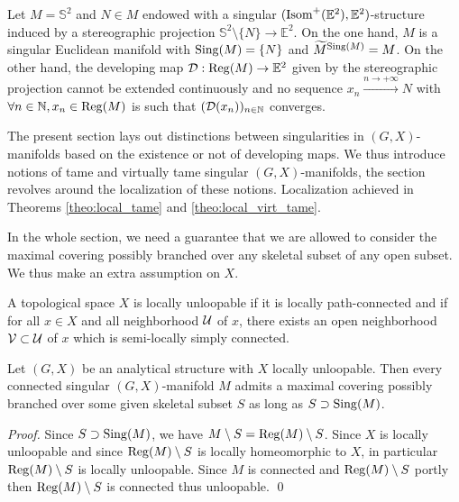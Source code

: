 \begin{ex}\label{ex:eucl_sphere} Let $M = \mathbb S^2$  and $N\in M$ endowed with a singular $(\mathrm{Isom}^+(\mathbb{E}^2),\mathbb E^2)$-structure induced by a stereographic projection $\mathbb S^2\setminus \{N\} \rightarrow \mathbb E^2$. 
On the one hand, $M$ is a singular Euclidean manifold with $\mathrm{Sing}(M)=\{N\}$ and  $\widetilde M^{\mathrm{Sing}(M)} = M$. On the other hand, the  developing map $\mathcal{D}:\mathrm{Reg}(M)\rightarrow \mathbb E^2$ given by  the stereographic projection  cannot be extended continuously and no sequence $x_n\xrightarrow{n\rightarrow +\infty} N$ with $\forall n\in\mathbb{N}, x_n\in \mathrm{Reg}(M)$ is such that $(\mathcal{D}(x_n))_{n\in \mathbb{N}}$ converges.
\end{ex}

The present section lays out distinctions between singularities in $(G,X)$-manifolds based on the existence or not of developing maps. We thus introduce notions of tame and virtually tame singular $(G,X)$-manifolds, the section revolves around the localization
of these notions. Localization achieved in Theorems \ref{theo:local_tame} and \ref{theo:local_virt_tame}.



In the whole section, we need a guarantee that we are allowed to consider the maximal covering possibly branched over any skeletal subset of any open subset. We thus make an extra assumption on $X$.
\begin{defi}\label{def:topological_space_locally_unloopable} A topological space $X$ is locally unloopable if it is locally path-connected and if for all 
$x\in X$ and all neighborhood $\mathcal{U}$ of $x$, there exists an open neighborhood $\mathcal V\subset \mathcal{U}$ of $x$ which is semi-locally simply connected.
\end{defi}
\begin{lem}\label{lem:analytical_structure_locally_unloopable} Let $(G,X)$ be an analytical structure with $X$ locally unloopable.  Then every connected singular $(G,X)$-manifold $M$ admits a maximal covering possibly branched over some given skeletal subset $S$ as long as $S\supset \mathrm{Sing}(M)$.
\end{lem}
\begin{proof} Since $S\supset \mathrm{Sing}(M)$, we have
 $M\setminus S = \mathrm{Reg}(M)\setminus S$. Since $X$ is locally unloopable and since $\mathrm{Reg}(M)\setminus S$ is locally homeomorphic to $X$, in particular $\mathrm{Reg}(M)\setminus S$ is locally unloopable. Since $M$ is connected and $\mathrm{Reg}(M)\setminus S$ portly then $\mathrm{Reg}(M)\setminus S$ is connected thus unloopable. 
\qed\end{proof}

